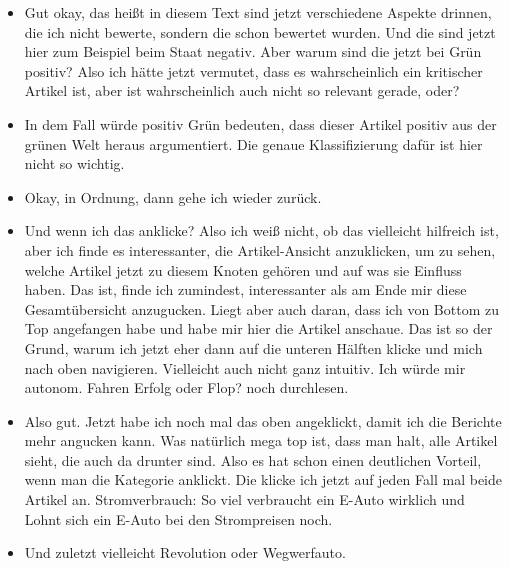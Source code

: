 {\begin{itemize}[]
                  \flqq Rohstoffe für E-Auto Akku\frqq{} - Da gibt es ja immer verschiedene Ansichten für die Rohstoffe von so einem E-Auto Akku.
                  Von daher hätte ich das jetzt einfach angeklickt, weil es halt am interessantesten klingt.
            \item {} Gut okay, das heißt in diesem Text sind jetzt verschiedene Aspekte drinnen, die ich nicht bewerte, sondern die schon bewertet wurden.
                  Und die sind jetzt hier zum Beispiel beim Staat negativ.
                  Aber warum sind die jetzt bei Grün positiv?
                  Also ich hätte jetzt vermutet, dass es wahrscheinlich ein kritischer Artikel ist, aber ist wahrscheinlich auch nicht so relevant gerade, oder?
            \item {} In dem Fall würde positiv Grün bedeuten, dass dieser Artikel positiv aus der grünen Welt heraus argumentiert.
                  Die genaue Klassifizierung dafür ist hier nicht so wichtig.
            \item {} Okay, in Ordnung, dann gehe ich wieder zurück.
            \item {} Und wenn ich das anklicke?
                  Also ich weiß nicht, ob das vielleicht hilfreich ist, aber ich finde es interessanter, die Artikel-Ansicht anzuklicken, um zu sehen, welche Artikel jetzt zu diesem Knoten gehören und auf was sie Einfluss haben.
                  Das ist, finde ich zumindest, interessanter als am Ende mir diese Gesamtübersicht anzugucken.
                  Liegt aber auch daran, dass ich von Bottom zu Top angefangen habe und habe mir hier die Artikel anschaue.
                  Das ist so der Grund, warum ich jetzt eher dann auf die unteren Hälften klicke und mich nach oben navigieren.
                  Vielleicht auch nicht ganz intuitiv.
                  Ich würde mir \flqq autonom. Fahren Erfolg oder Flop?\frqq{} noch durchlesen.
            \item {} Also gut. Jetzt habe ich noch mal das oben angeklickt, damit ich die Berichte mehr angucken kann.
                  Was natürlich mega top ist, dass man halt, alle Artikel sieht, die auch da drunter sind.
                  Also es hat schon einen deutlichen Vorteil, wenn man die Kategorie anklickt.
                  Die klicke ich jetzt auf jeden Fall mal beide Artikel an.
                  \flqq Stromverbrauch: So viel verbraucht ein E-Auto wirklich\frqq{} und \flqq Lohnt sich ein E-Auto bei den Strompreisen noch\frqq{}.
            \item {} Und zuletzt vielleicht \flqq Revolution oder Wegwerfauto\frqq{}.

\end{itemize}}
